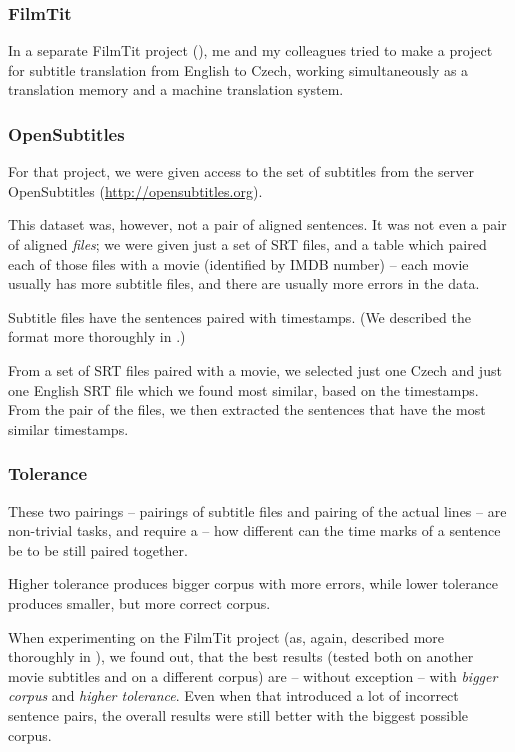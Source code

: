 \subsubsection{FilmTit}

In a separate FilmTit project (\cite{filmtit}), me and my colleagues  tried to make a project for subtitle translation from English to Czech, working simultaneously as a translation memory and a machine translation system.
\subsubsection{OpenSubtitles}

For that project, we were given access to the set of subtitles from the server OpenSubtitles (\url{http://opensubtitles.org}). 

This dataset was, however, not a pair of aligned sentences. It was not even a pair of aligned \emph{files}; we were given just a set of SRT files, and a table which paired each of those files with a movie (identified by IMDB number) -- each movie usually has more subtitle files, and there are usually more errors in the data. 

Subtitle files have the sentences paired with timestamps. (We described the format more thoroughly in \cite{filmtit}.)

From a set of SRT files paired with a movie, we selected just one Czech and just one English SRT file which we found most similar, based on the timestamps.
From the pair of the files, we then extracted the sentences that have the most similar timestamps.
\subsubsection{Tolerance}

These two pairings -- pairings of subtitle files and pairing of the actual lines -- are non-trivial tasks, and require a  -- how different can the time marks of a sentence be to be still paired together.

Higher tolerance produces bigger corpus with more errors, while lower tolerance produces smaller, but more correct corpus.

When experimenting on the FilmTit project (as, again, described more thoroughly in \cite{filmtit}), we found out, that the best results (tested both on another movie subtitles and on a different corpus) are -- without exception -- with \emph{bigger corpus} and \emph{higher tolerance}. Even when that introduced a lot of incorrect sentence pairs, the overall results were still better with the biggest possible corpus.

